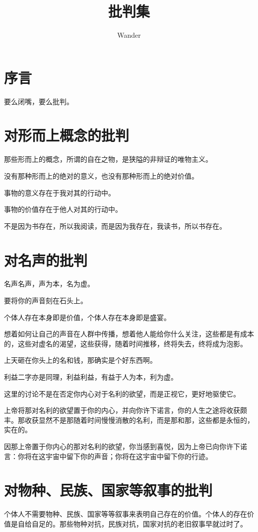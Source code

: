 \documentclass[12pt,oneside]{book}
\title{批判集}
\author{Wander}
\begin{document}
\makemytitleA
{}

\frontmatter 
{}
\chapter*{序言}
要么闭嘴，要么批判。

\setcounter{tocdepth}{2}    
\tableofcontents


\mainmatter


\chapter{对形而上概念的批判}
那些形而上的概念，所谓的自在之物，是狭隘的非辩证的唯物主义。

没有那种形而上的绝对的意义，也没有那种形而上的绝对价值。

事物的意义存在于我对其的行动中。

事物的价值存在于他人对其的行动中。

不是因为书存在，所以我阅读，而是因为我存在，我读书，所以书存在。




\chapter{对名声的批判}
名声名声，声为本，名为虚。

要将你的声音刻在石头上。

个体人存在本身即是价值，个体人存在本身即是盛宴。

想着如何让自己的声音在人群中传播，想着他人能给你什么关注，这些都是有成本的，这些对虚名的渴望，这些获得，随着时间推移，终将失去，终将成为泡影。

上天砸在你头上的名和钱，那确实是个好东西啊。

利益二字亦是同理，利益利益，有益于人为本，利为虚。

这里的讨论不是在否定你内心对于名利的欲望，而是正视它，更好地驱使它。

上帝将那对名利的欲望置于你的内心，并向你许下诺言，你的人生之途将收获颇丰。那收获显然不是那随着时间慢慢消散的名利，而是那和那，这些都是永恒的，实在的。

因那上帝置于你内心的那对名利的欲望，你当感到喜悦，因为上帝已向你许下诺言：你将在这宇宙中留下你的声音；你将在这宇宙中留下你的行迹。

\chapter{对物种、民族、国家等叙事的批判}
个体人不需要物种、民族、国家等等叙事来表明自己存在的价值。个体人的存在价值是自给自足的。那些物种对抗，民族对抗，国家对抗的老旧叙事早就过时了。
\end{document}
